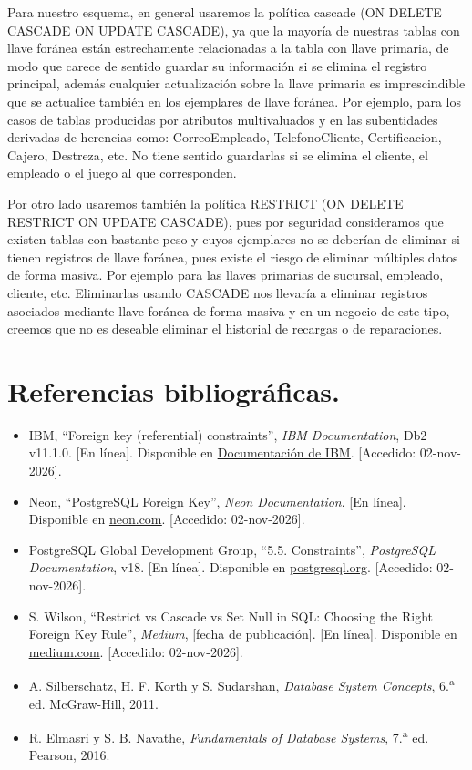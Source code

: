 \documentclass[12pt]{article}
\begin{document}
Para nuestro esquema, en general usaremos la política cascade (ON DELETE CASCADE ON UPDATE CASCADE), ya que la mayoría de nuestras tablas con llave foránea están estrechamente relacionadas a la tabla con llave primaria, de modo que carece de sentido guardar su información si se elimina el registro principal, además cualquier actualización sobre la llave primaria es imprescindible que se actualice también en los ejemplares de llave foránea. Por ejemplo, para los casos de tablas producidas por atributos multivaluados y en las subentidades derivadas de herencias como: CorreoEmpleado, TelefonoCliente, Certificacion, Cajero, Destreza, etc. No tiene sentido guardarlas si se elimina el cliente, el empleado o el juego al que corresponden.

Por otro lado usaremos también la política RESTRICT (ON DELETE RESTRICT ON UPDATE CASCADE), pues por seguridad consideramos que existen tablas con bastante peso y cuyos ejemplares no se deberían de eliminar si tienen registros de llave foránea, pues existe el riesgo de eliminar múltiples datos de forma masiva. Por ejemplo para las llaves primarias de sucursal, empleado, cliente, etc. Eliminarlas usando CASCADE nos llevaría a eliminar registros asociados mediante llave foránea de forma masiva y en un negocio de este tipo, creemos que no es deseable eliminar el historial de recargas o de reparaciones.

\section*{Referencias bibliográficas.}
\begin{itemize}
    \item [1] IBM, ``Foreign key (referential) constraints'', \textit{IBM Documentation}, Db2 v11.1.0. [En línea]. Disponible en \href{https://www.ibm.com/docs/es/db2/11.1.0?topic=constraints-foreign-key-referential}{\underline{Documentación de IBM}}. [Accedido: 02-nov-2026].
    \item [2] Neon, ``PostgreSQL Foreign Key'', \textit{Neon Documentation}. [En línea]. Disponible en \href{https://neon.com/postgresql/tutorial/foreign-key}{\underline{neon.com}}. [Accedido: 02-nov-2026].
    \item [3] PostgreSQL Global Development Group, ``5.5. Constraints'', \textit{PostgreSQL Documentation}, v18. [En línea]. Disponible en \href{https://www.postgresql.org/docs/18/ddl-constraints.html}{\underline{postgresql.org}}. [Accedido: 02-nov-2026].
    \item [4] S. Wilson, ``Restrict vs Cascade vs Set Null in SQL: Choosing the Right Foreign Key Rule'', \textit{Medium}, [fecha de publicación]. [En línea]. Disponible en \href{https://medium.com/@sunnywilson.veshapogu/restrict-vs-cascade-vs-set-null-in-sql-choosing-the-right-foreign-key-rule-6d7c98484710}{\underline{medium.com}}. [Accedido: 02-nov-2026].
    \item [5] A. Silberschatz, H. F. Korth y S. Sudarshan, \textit{Database System Concepts}, 6.\textsuperscript{a} ed. McGraw-Hill, 2011.
    \item [6] R. Elmasri y S. B. Navathe, \textit{Fundamentals of Database Systems}, 7.\textsuperscript{a} ed. Pearson, 2016.
\end{itemize}
\end{document}
